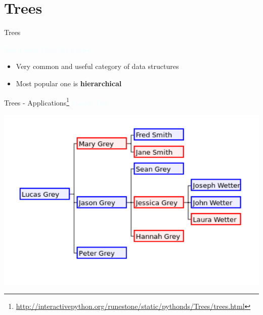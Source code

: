\documentclass{beamer}
\newcommand{\tblue}[1]{{\Large {\textcolor{azure}{#1}}}}
\begin{document}
\section{Trees}

\begin{frame}{Trees}

\tblue{Non-Linear Data Structures:}
\begin{itemize}
\item Very common and useful category of data structures
\item Most popular one is {\bf hierarchical}
\end{itemize}
\end{frame}



\begin{frame}{Trees - Applications\footnote{\url{http://interactivepython.org/runestone/static/pythonds/Trees/trees.html}}}
\tblue{Family Tree:}
\begin{center}
    \includegraphics[scale=0.44]{treesEg2.png}
\end{center}
\end{frame}
\end{document}
